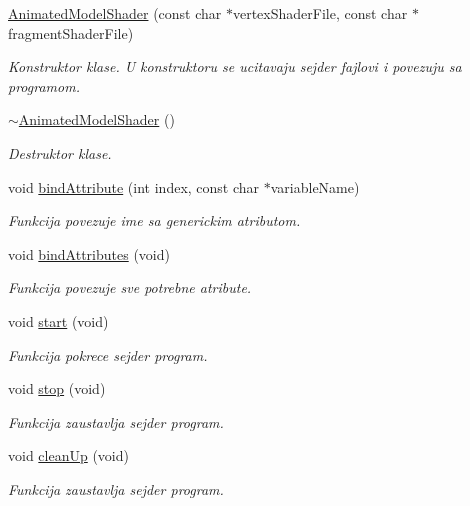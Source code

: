 \begin{DoxyCompactItemize}
\item 
\hyperlink{classshader_1_1AnimatedModelShader_a4fefb7f1416c2b2cd10b043e13f1497f}{Animated\+Model\+Shader} (const char $\ast$vertex\+Shader\+File, const char $\ast$fragment\+Shader\+File)
\begin{DoxyCompactList}\small\item\em Konstruktor klase. U konstruktoru se ucitavaju sejder fajlovi i povezuju sa programom. \end{DoxyCompactList}\item 
\hyperlink{classshader_1_1AnimatedModelShader_a289d4165e5c06f85051af03653d8ae6b}{$\sim$\+Animated\+Model\+Shader} ()
\begin{DoxyCompactList}\small\item\em Destruktor klase. \end{DoxyCompactList}\item 
void \hyperlink{classshader_1_1AnimatedModelShader_a3c47a70e671a3b7a974c16562ba589b7}{bind\+Attribute} (int index, const char $\ast$variable\+Name)
\begin{DoxyCompactList}\small\item\em Funkcija povezuje ime sa generickim atributom. \end{DoxyCompactList}\item 
void \hyperlink{classshader_1_1AnimatedModelShader_a447ad01d4385f85b47c2d99b076d9b4f}{bind\+Attributes} (void)
\begin{DoxyCompactList}\small\item\em Funkcija povezuje sve potrebne atribute. \end{DoxyCompactList}\item 
void \hyperlink{classshader_1_1AnimatedModelShader_adae3f58a0687245d7be0be21c99a1360}{start} (void)
\begin{DoxyCompactList}\small\item\em Funkcija pokrece sejder program. \end{DoxyCompactList}\item 
void \hyperlink{classshader_1_1AnimatedModelShader_ab50582c18de55c4922fb7d8847836251}{stop} (void)
\begin{DoxyCompactList}\small\item\em Funkcija zaustavlja sejder program. \end{DoxyCompactList}\item 
void \hyperlink{classshader_1_1AnimatedModelShader_a9b7ce34a85b989b6468eaa1efe1a3928}{clean\+Up} (void)
\begin{DoxyCompactList}\small\item\em Funkcija zaustavlja sejder program. \end{DoxyCompactList}\item 

\end{DoxyCompactItemize}
